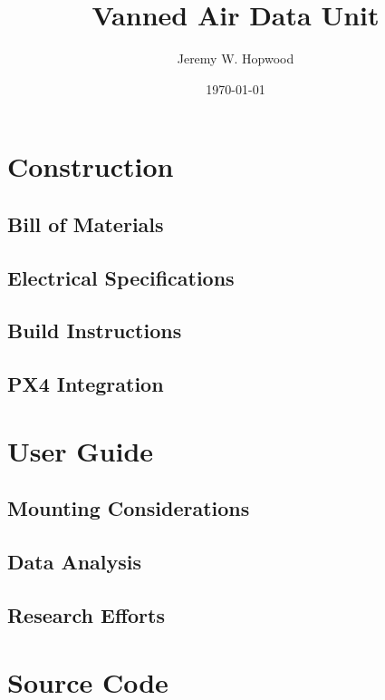 \documentclass[10pt,onecolumn]{article}
\title{Vanned Air Data Unit}
\author{Jeremy W. Hopwood}
\date{\today}
\begin{document}
	
\maketitle

\tableofcontents

\section{Construction}

	\subsection{Bill of Materials}

	\subsection{Electrical Specifications}

	\subsection{Build Instructions}
	
	\subsection{PX4 Integration}

\section{User Guide}

	\subsection{Mounting Considerations}
	
	\subsection{Data Analysis}
	
	\subsection{Research Efforts}

\appendix
\section{Source Code}
\end{document}
